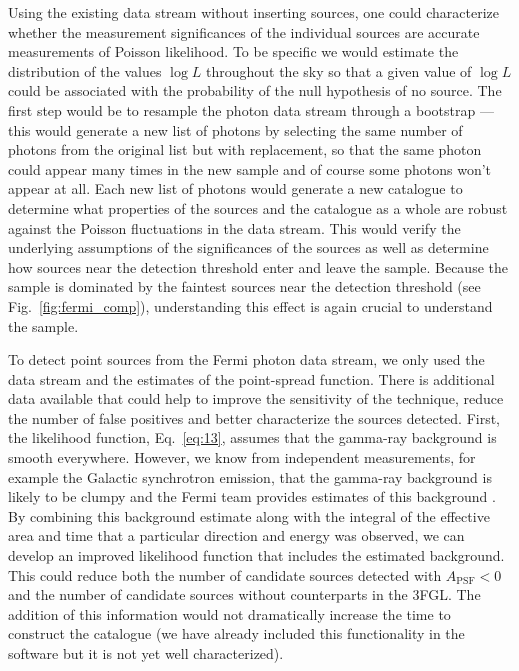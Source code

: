 \documentclass[useAMS,usenatbib]{mn2e}
\begin{document}
Using the existing data stream without inserting sources, one could
characterize whether the measurement significances of the individual
sources are accurate measurements of Poisson likelihood.  To be specific
we would estimate the distribution of the values $\log L$ throughout
the sky so that a given value of $\log L$ could be associated with
the probability of the null hypothesis of no source. The
first step would be to resample the photon data stream through a
bootstrap --- this would generate a new list of photons by selecting
the same number of photons from the original list but with
replacement, so that the same photon could appear many times in the
new sample and of course some photons won't appear at all.  Each new
list of photons would generate a new catalogue to determine what
properties of the sources and the catalogue as a whole are robust
against the Poisson fluctuations in the data stream.  This would
verify the underlying assumptions of the significances of the sources
as well as determine how sources near the detection threshold enter
and leave the sample.  Because the sample is dominated by the faintest
sources near the detection threshold (see Fig.~\ref{fig:fermi_comp}),
understanding this effect is again crucial to understand the sample.

To detect point sources from the Fermi photon data stream, we only
used the data stream and the estimates of the point-spread
function. There is additional data available that could help to
improve the sensitivity of the technique, reduce the number of false
positives and better characterize the sources detected.  First, the
likelihood function, Eq.~\ref{eq:13}, assumes that the gamma-ray
background is smooth everywhere.  However, we know from independent
measurements, for example the Galactic synchrotron emission, that the
gamma-ray background is likely to be clumpy and the Fermi team
provides estimates of this background \citep[e.g.][]{Fermi1602.07246}.
By combining this background
estimate along with the integral of the effective area and time that a
particular direction and energy was observed, we can develop an
improved likelihood function that includes the estimated background.
This could reduce both the number of candidate sources detected with
$A_\mathrm{PSF}<0$ and the number of candidate sources without
counterparts in the 3FGL.  The addition of this information would not
dramatically increase the time to construct the catalogue (we have
already included this functionality in the software but it is not yet
well characterized).
\end{document}
